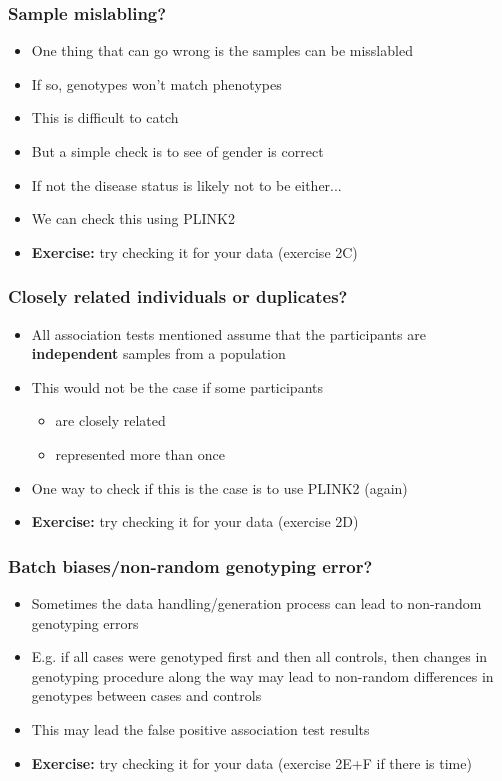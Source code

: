 \documentclass[xcolor=pdftex,dvipsnames,table,10pt]{beamer}
\begin{document}
\begin{frame}
\frametitle{Sample mislabling?}
\vspace{-1.9cm}
\small
\begin{itemize}
\item One thing that can go wrong is the samples can be misslabled
\item If so, genotypes won't match phenotypes
\item This is difficult to catch
\item But a simple check is to see of gender is correct
\item If not the disease status is likely not to be either...
\item We can check this using PLINK2
\item<2-> \textbf{Exercise:} try checking it for your data (exercise 2C)
\end{itemize}

\end{frame}

\begin{frame}
\frametitle{Closely related individuals or duplicates?}
\vspace{-1.9cm}
\small
\begin{itemize}
\item All association tests mentioned assume that the participants are \textbf{independent} samples from a population
\item This would not be the case if some participants 
\begin{itemize}
\item are closely related 
\item represented more than once 
\end{itemize}
\item One way to check if this is the case is to use PLINK2 (again) %
\item<2-> \textbf{Exercise:} try checking it for your data (exercise 2D)
\end{itemize}

\end{frame}

\begin{frame}
\frametitle{Batch biases/non-random genotyping error?}
\vspace{-1.9cm}
\small
\begin{itemize}
\item Sometimes the data handling/generation process can lead to non-random genotyping errors
\item E.g. if all cases were genotyped first and then all controls, then changes in genotyping procedure along the way may lead to non-random differences in genotypes between cases and controls    
\item  This may lead the false positive association test results
\item<2-> \textbf{Exercise:} try checking it for your data (exercise 2E+F if there is time)
\end{itemize}
\end{frame}
\end{document}
